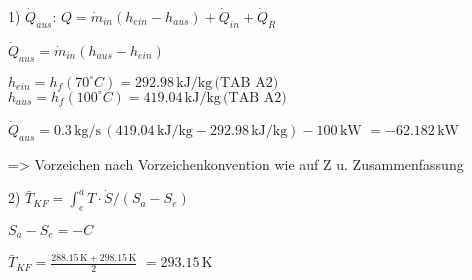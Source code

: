 1) \( \dot{Q}_{aus} \):  
\( Q = \dot{m}_{in} (h_{ein} - h_{aus}) + \dot{Q}_{in} + \dot{Q}_R \)  

\( \dot{Q}_{aus} = \dot{m}_{in} (h_{aus} - h_{ein}) \)  

\( h_{ein} = h_f (70^\circ C) = 292.98 \, \text{kJ/kg} \, \text{(TAB A2)} \)  
\( h_{aus} = h_f (100^\circ C) = 419.04 \, \text{kJ/kg} \, \text{(TAB A2)} \)  

\( \dot{Q}_{aus} = 0.3 \, \text{kg/s} \, (419.04 \, \text{kJ/kg} - 292.98 \, \text{kJ/kg}) - 100 \, \text{kW} \)  
\( = -62.182 \, \text{kW} \)  

=> Vorzeichen nach Vorzeichenkonvention wie auf Z u. Zusammenfassung  

2)  
\( \bar{T}_{KF} = \int_{e}^{a} T \cdot \dot{S} / (S_a - S_e) \)  

\( S_a - S_e = -C \)  

\( \bar{T}_{KF} = \frac{288.15 \, \text{K} + 298.15 \, \text{K}}{2} \)  
\( = 293.15 \, \text{K} \)